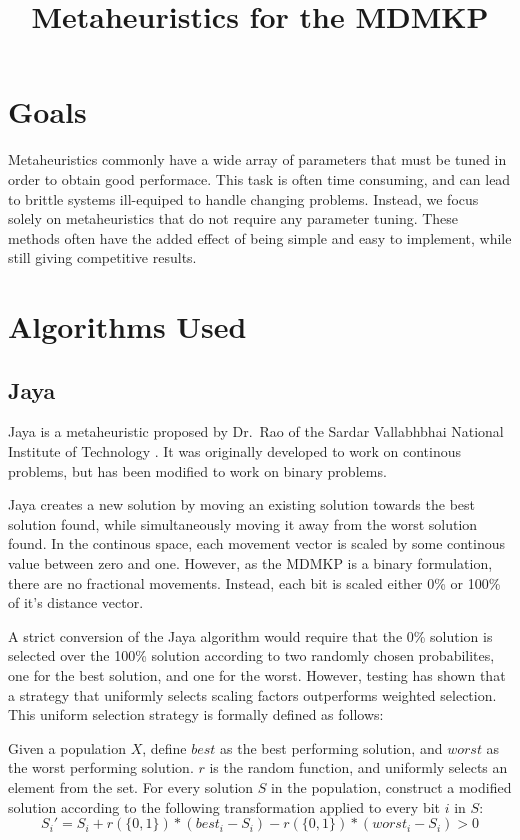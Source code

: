 \documentclass[11pt, letterpaper, onecolumn]{article}
\title{\textbf{Metaheuristics for the MDMKP}}
\begin{document}
\maketitle

\section{Goals}

Metaheuristics commonly have a wide array of parameters that must be tuned in order to
obtain good performace. This task is often time consuming, and can lead to brittle systems
ill-equiped to handle changing problems. Instead, we focus solely on metaheuristics that
do not require any parameter tuning. These methods often have the added effect of being
simple and easy to implement, while still giving competitive results.

\section{Algorithms Used}

\subsection{Jaya}

Jaya is a metaheuristic proposed by Dr.~Rao of the Sardar Vallabhbhai National
Institute of Technology%
. It was originally developed to work on continous
problems, but has been modified to work on binary problems.

Jaya creates a new solution by moving an existing solution towards the best solution found, while simultaneously moving it away from the worst solution found. In the continous space, each movement vector is scaled by some continous value between zero and one. However, as the MDMKP is a binary formulation, there are no fractional movements. Instead, each bit is scaled either 0\% or 100\% of it's distance vector. 

A strict conversion of the Jaya algorithm would require that the 0\% solution is selected over the 100\% solution according to two randomly chosen probabilites, one for the best solution, and one for the worst. However, testing has shown that a strategy that uniformly selects scaling factors outperforms weighted selection. This uniform selection strategy is formally defined as follows: 

 Given a population $X$, define $best$ as the best performing solution, and $worst$ as the worst performing solution. $r$ is the random function, and uniformly selects an element from the set. For every solution $S$ in the population, construct a modified solution according to the following transformation applied to every bit $i$ in $S$:
\begin{equation} S_i' = S_i + r(\{0, 1\})*(best_i - S_i) - r(\{0, 1\})*(worst_i - S_i) > 0 \end{equation}
\end{document}
